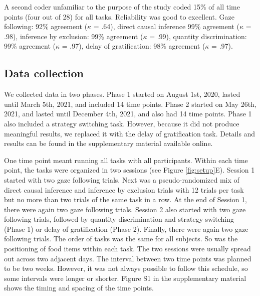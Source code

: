 \documentclass[
  man,floatsintext]{apa6}
\begin{document}
A second coder unfamiliar to the purpose of the study coded 15\% of all time points (four out of 28) for all tasks. Reliability was good to excellent. Gaze following: 92\% agreement (\(\kappa\) = .64), direct causal inference 99\% agreement (\(\kappa\) = .98), inference by exclusion: 99\% agreement (\(\kappa\) = .99), quantity discrimination: 99\% agreement (\(\kappa\) = .97), delay of gratification: 98\% agreement (\(\kappa\) = .97).

\hypertarget{data-collection}{%
\subsection{Data collection}\label{data-collection}}

We collected data in two phases. Phase 1 started on August 1st, 2020, lasted until March 5th, 2021, and included 14 time points. Phase 2 started on May 26th, 2021, and lasted until December 4th, 2021, and also had 14 time points. Phase 1 also included a strategy switching task. However, because it did not produce meaningful results, we replaced it with the delay of gratification task. Details and results can be found in the supplementary material available online.

One time point meant running all tasks with all participants. Within each time point, the tasks were organized in two sessions (see Figure \ref{fig:setup}E). Session 1 started with two gaze following trials. Next was a pseudo-randomized mix of direct causal inference and inference by exclusion trials with 12 trials per task but no more than two trials of the same task in a row. At the end of Session 1, there were again two gaze following trials. Session 2 also started with two gaze following trials, followed by quantity discrimination and strategy switching (Phase 1) or delay of gratification (Phase 2). Finally, there were again two gaze following trials. The order of tasks was the same for all subjects. So was the positioning of food items within each task. The two sessions were usually spread out across two adjacent days. The interval between two time points was planned to be two weeks. However, it was not always possible to follow this schedule, so some intervals were longer or shorter. Figure S1 in the supplementary material shows the timing and spacing of the time points.
\end{document}
